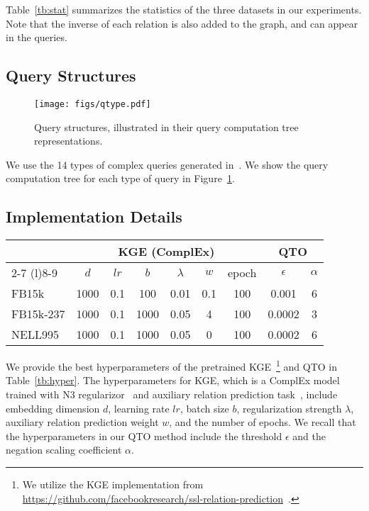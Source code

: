Table~\ref{tb:stat} summarizes the statistics of the three datasets in our experiments.
Note that the inverse of each relation is also added to the graph, and can appear in the queries.

\subsection{Query Structures}
\label{app:query}

\begin{figure}[htbp]
\centering
\texttt{[image: figs/qtype.pdf]}
\caption{Query structures, illustrated in their query computation tree representations.}
\label{fig:qtype}
\end{figure}

We use the 14 types of complex queries generated in~\cite{ren2019query2box, ren2020beta}. We show the query computation tree for each type of query in Figure~\ref{fig:qtype}.

\subsection{Implementation Details}
\label{app:detail}

\begin{table*}[!h]
\centering
\begin{tabular}{lcccccccc}
\toprule
 & \multicolumn{6}{c}{KGE (ComplEx)} & \multicolumn{2}{c}{QTO} \\
\cmidrule(l){2-7} \cmidrule(l){8-9}
& $d$ & $lr$ & $b$ & $\lambda$ & $w$ & epoch & $\epsilon$ & $\alpha$ \\
\midrule
FB15k & 1000 & 0.1 & 100 & 0.01 & 0.1 & 100 & 0.001 & 6 \\
FB15k-237 & 1000 & 0.1 & 1000 & 0.05 & 4 & 100 & 0.0002 & 3 \\
NELL995 & 1000 & 0.1 & 1000 & 0.05 & 0 & 100 & 0.0002 & 6 \\
\toprule
\end{tabular}
\caption{Hyperparameters of pretrained KGE and QTO.}
\label{tb:hyper}
\end{table*}

We provide the best hyperparameters of the pretrained KGE~\footnote{We utilize the KGE implementation from \href{https://github.com/facebookresearch/ssl-relation-prediction}{https://github.com/facebookresearch/ssl-relation-prediction}~\cite{chen2021relation}.} and QTO in Table~\ref{tb:hyper}.
The hyperparameters for KGE, which is a ComplEx model~\cite{trouillon2016complex} trained with N3 regularizor~\cite{lacroix2018canonical} and auxiliary relation prediction task~\cite{chen2021relation}, include embedding dimension $d$, learning rate $lr$, batch size $b$, regularization strength $\lambda$, auxiliary relation prediction weight $w$, and the number of epochs.
We recall that the hyperparameters in our QTO method include the threshold $\epsilon$ and the negation scaling coefficient $\alpha$.


